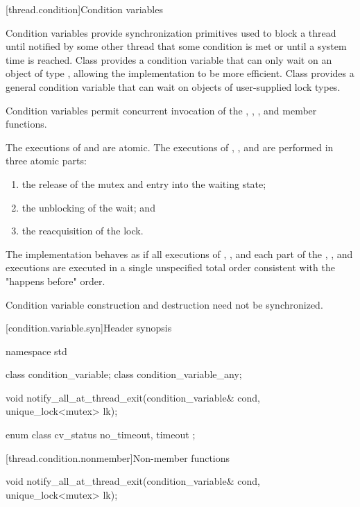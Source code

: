 [thread.condition]{Condition variables}

\pnum
Condition variables provide synchronization primitives used to block a thread until
notified by some other thread that some condition is met or until a system time is
reached. Class  provides a condition variable that can only
wait on an object of type , allowing the implementation
to be more efficient. Class  provides a general
condition variable that can wait on objects of user-supplied lock types.

\pnum
Condition variables permit concurrent invocation of the , ,
,  and  member functions.

\pnum
The executions of  and 
are atomic.
The executions of , , and  are performed
in three atomic parts:
\begin{enumerate}
\item the release of the mutex and entry into the waiting state;
\item the unblocking of the wait; and
\item the reacquisition of the lock.
\end{enumerate}

\pnum
The implementation behaves as if all executions of , , and each
part of the , , and  executions are
executed in a single unspecified total order consistent with the "happens before" order.

\pnum
Condition variable construction and destruction need not be synchronized.

[condition.variable.syn]{Header  synopsis}

%
%
\begin{codeblock}
namespace std {
  class condition_variable;
  class condition_variable_any;

  void notify_all_at_thread_exit(condition_variable& cond, unique_lock<mutex> lk);

  enum class cv_status { no_timeout, timeout };
}
\end{codeblock}

[thread.condition.nonmember]{Non-member functions}
%
\begin{itemdecl}
void notify_all_at_thread_exit(condition_variable& cond, unique_lock<mutex> lk);
\end{itemdecl}

